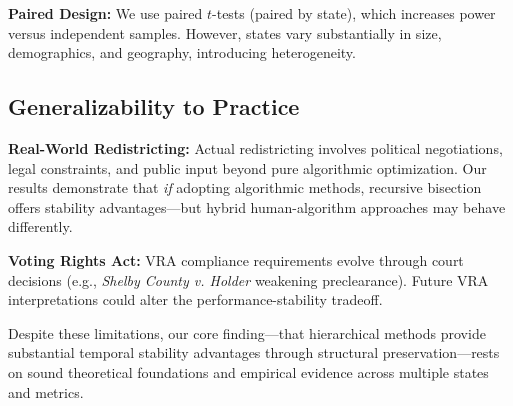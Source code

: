 \textbf{Paired Design:} We use paired $t$-tests (paired by state), which increases power versus independent samples. However, states vary substantially in size, demographics, and geography, introducing heterogeneity.

\subsection{Generalizability to Practice}

\textbf{Real-World Redistricting:} Actual redistricting involves political negotiations, legal constraints, and public input beyond pure algorithmic optimization. Our results demonstrate that \emph{if} adopting algorithmic methods, recursive bisection offers stability advantages—but hybrid human-algorithm approaches may behave differently.

\textbf{Voting Rights Act:} VRA compliance requirements evolve through court decisions (e.g., \emph{Shelby County v. Holder} weakening preclearance). Future VRA interpretations could alter the performance-stability tradeoff.

Despite these limitations, our core finding—that hierarchical methods provide substantial temporal stability advantages through structural preservation—rests on sound theoretical foundations and empirical evidence across multiple states and metrics.

